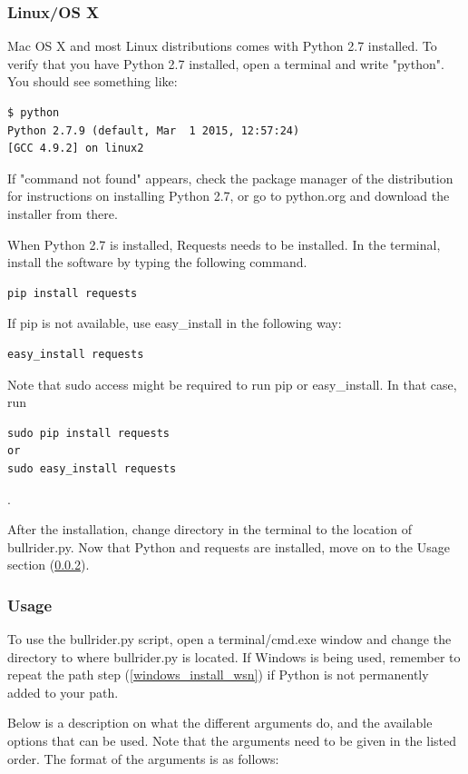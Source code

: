 \subsubsection{Linux/OS X}
Mac OS X and most Linux distributions comes with Python 2.7 installed. To verify that you have Python 2.7 installed, open a terminal and write "python". You should see something like:
\begin{verbatim}
$ python
Python 2.7.9 (default, Mar  1 2015, 12:57:24)
[GCC 4.9.2] on linux2
\end{verbatim}

\noindent If "command not found" appears, check the package manager of the distribution for instructions on installing Python 2.7, or go to python.org and download the installer from there.

When Python 2.7 is installed, Requests needs to be installed. In the terminal, install the software by typing the following command.

\begin{verbatim}
pip install requests
\end{verbatim}

\noindent If pip is not available, use easy\_install in the following way:

\begin{verbatim}
easy_install requests
\end{verbatim}

\noindent Note that sudo access might be required to run pip or easy\_install. In that case, run 
\begin{verbatim} 
sudo pip install requests
or
sudo easy_install requests 
\end{verbatim}.

\noindent After the installation, change directory in the terminal to the location of bullrider.py. Now that Python and requests are installed, move on to the Usage section (\ref{subsubsec:usermanual_Testscripts_usage}).


\subsubsection{Usage}
\label{subsubsec:usermanual_Testscripts_usage}
To use the bullrider.py script, open a terminal/cmd.exe window and change the directory to where bullrider.py is located. If Windows is being used, remember to repeat the path step (\ref{windows_install_wsn}) if Python is not permanently added to your path. 

Below is a description on what the different arguments do, and the available options that can be used. Note that the arguments need to be given in the listed order.
The format of the arguments is as follows:

